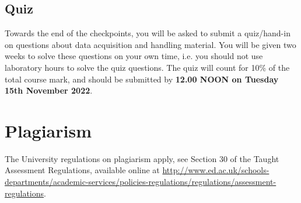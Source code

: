 \subsection{Quiz}

Towards the end of the checkpoints, you will be asked to submit a quiz/hand-in on questions about data acquisition and handling material.
You will be given two weeks to solve these questions on your own time, i.e. you should not use laboratory hours to solve the quiz questions.
The quiz will count for 10\% of the total course mark, and should be submitted by {\bf 12.00 NOON on Tuesday 15th November 2022}.

\section{Plagiarism}

The University regulations on plagiarism apply, see Section 30 of the Taught Assessment Regulations, available online at \url{http://www.ed.ac.uk/schools-departments/academic-services/policies-regulations/regulations/assessment-regulations}.
